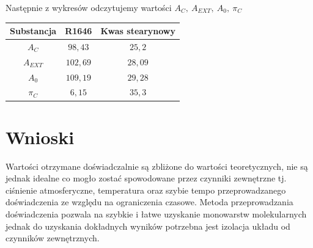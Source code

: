 \documentclass[a4paper,12pt]{extarticle}
\begin{document}
  Następnie z wykresów odczytujemy wartości \( A_C,\ A_{EXT},\ A_{0},\ \pi_C \)

  \begin{table}[H]
    \centering
    \begin{tabular}{c|cc}
    \toprule
    \textbf{Substancja} & R1646 & Kwas stearynowy \\
    \midrule
    \textbf{\( A_C \)}     & \( 98,43 \)  & \( 25,2 \)  \\
    \textbf{\( A_{EXT} \)} & \( 102,69 \) & \( 28,09 \) \\
    \textbf{\( A_{0} \)}   & \( 109,19 \) & \( 29,28 \) \\
    \textbf{\( \pi_C \)}   & \( 6,15 \)   & \( 35,3 \)  \\
    \bottomrule
    \end{tabular}
  \end{table}

  \section{Wnioski}
  Wartości otrzymane doświadczalnie są zbliżone do wartości teoretycznych,
  nie są jednak idealne co mogło zostać spowodowane przez czynniki zewnętrzne tj.
  ciśnienie atmosferyczne, temperatura oraz szybie tempo przeprowadzanego doświadczenia
  ze względu na ograniczenia czasowe. Metoda przeprowadzania doświadczenia
  pozwala na szybkie i łatwe uzyskanie monowarstw molekularnych jednak do uzyskania
  dokładnych wyników potrzebna jest izolacja układu od czynników zewnętrznych.
\end{document}
